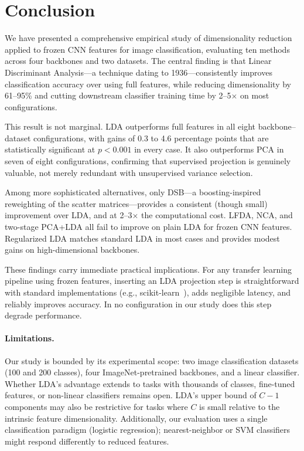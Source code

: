 \section{Conclusion}
\label{sec:conclusion}

We have presented a comprehensive empirical study of dimensionality reduction applied to frozen CNN features for image classification, evaluating ten methods across four backbones and two datasets. The central finding is that Linear Discriminant Analysis---a technique dating to 1936---consistently improves classification accuracy over using full features, while reducing dimensionality by 61--95\% and cutting downstream classifier training time by 2--5$\times$ on most configurations.

This result is not marginal. LDA outperforms full features in all eight backbone--dataset configurations, with gains of 0.3 to 4.6 percentage points that are statistically significant at $p < 0.001$ in every case. It also outperforms PCA in seven of eight configurations, confirming that supervised projection is genuinely valuable, not merely redundant with unsupervised variance selection.

Among more sophisticated alternatives, only DSB---a boosting-inspired reweighting of the scatter matrices---provides a consistent (though small) improvement over LDA, and at 2--3$\times$ the computational cost. LFDA, NCA, and two-stage PCA+LDA all fail to improve on plain LDA for frozen CNN features. Regularized LDA matches standard LDA in most cases and provides modest gains on high-dimensional backbones.

These findings carry immediate practical implications. For any transfer learning pipeline using frozen features, inserting an LDA projection step is straightforward with standard implementations (e.g., scikit-learn~\cite{sklearn}), adds negligible latency, and reliably improves accuracy. In no configuration in our study does this step degrade performance.

\paragraph{Limitations.} Our study is bounded by its experimental scope: two image classification datasets (100 and 200 classes), four ImageNet-pretrained backbones, and a linear classifier. Whether LDA's advantage extends to tasks with thousands of classes, fine-tuned features, or non-linear classifiers remains open. LDA's upper bound of $C-1$ components may also be restrictive for tasks where $C$ is small relative to the intrinsic feature dimensionality. Additionally, our evaluation uses a single classification paradigm (logistic regression); nearest-neighbor or SVM classifiers might respond differently to reduced features.

